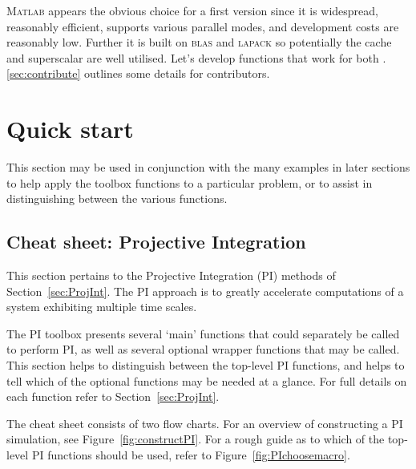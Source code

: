 \begin{userExample}
\textsc{Matlab} appears the obvious choice for a first version since it is widespread, reasonably efficient, supports various parallel modes, and development costs are reasonably low.
Further it is built on \textsc{blas} and \textsc{lapack} so potentially the cache and superscalar \cpu{} are well utilised.
Let's develop functions that work for both \script.
\cref{sec:contribute} outlines some details for contributors.


\section{Quick start}
\localtableofcontents
This section may be used in conjunction with the many examples in later sections to help apply the toolbox functions to a particular problem, or to assist in distinguishing between the various functions.

\subsection{Cheat sheet: Projective Integration}
This section pertains to the Projective Integration (PI) methods of Section~\ref{sec:ProjInt}. The PI approach is to greatly accelerate computations of a system exhibiting multiple time scales.

The PI toolbox presents several `main' functions that could separately be called to perform PI, as well as several optional wrapper functions that may be called. This section helps to distinguish between the top-level PI functions, and helps to tell which of the optional functions may be needed at a glance. For full details on each function refer to Section~\ref{sec:ProjInt}.

The cheat sheet consists of two flow charts. For an overview of constructing a PI simulation, see Figure~\ref{fig:constructPI}. For a rough guide as to which of the top-level PI functions should be used, refer to Figure~\ref{fig:PIchoosemacro}.



\end{userExample}
